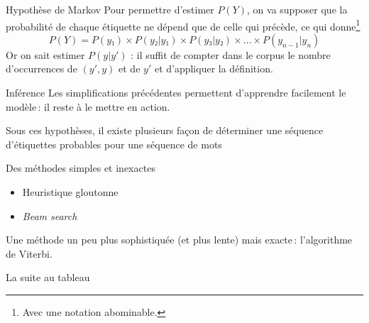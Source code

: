 \documentclass[hyperref={unicode}, xcolor={svgnames}, french]{beamer}
\begin{document}

\begin{frame}{Hypothèse de Markov}
	Pour permettre d'estimer $P(Y)$, on va supposer que la probabilité de chaque étiquette ne dépend que de celle qui précède, ce qui donne\footnote{Avec une notation abominable.}
	\begin{equation}
		P(Y) = P(y₁)×P(y₂|y₁)×P(y₃|y₂)×…×P(y_{n-1}|y_n)
	\end{equation}
	Or on sait estimer $P(y|y')$ : il suffit de compter dans le corpus le nombre d'occurrences de $(y',y)$ et de $y'$ et d'appliquer la définition.
\end{frame}

\begin{frame}{Inférence}
	Les simplifications précédentes permettent d'apprendre facilement le modèle : il reste à le mettre en action.

	Sous ces hypothèses, il existe plusieurs façon de déterminer une séquence d'étiquettes probables pour une séquence de mots

	Des méthodes simples et inexactes
	\begin{itemize}
		\item Heuristique gloutonne
		\item \emph{Beam search}
	\end{itemize}

	Une méthode un peu plus sophistiquée (et plus lente) mais exacte : l'algorithme de Viterbi.
\end{frame}

\begin{frame}[standout]
	La suite au tableau
\end{frame}



\end{document}
